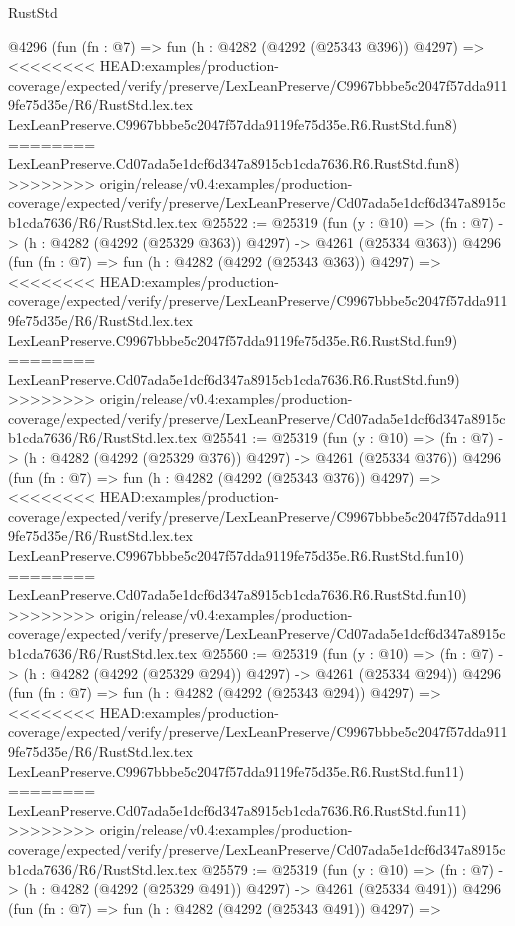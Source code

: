 \begin{lexlean}{RustStd}
\begin{coremodule}
{\begin{coremodule}
{{{{{{{{{{{{{{{{{{{{{{{{{{{{{{{{{{{    @4296
    (fun (fn : @7) =>
    fun (h : @4282 (@4292 (@25343 @396)) @4297) =>
<<<<<<<< HEAD:examples/production-coverage/expected/verify/preserve/LexLeanPreserve/C9967bbbe5c2047f57dda9119fe75d35e/R6/RustStd.lex.tex
    LexLeanPreserve.C9967bbbe5c2047f57dda9119fe75d35e.R6.RustStd.fun8)
========
    LexLeanPreserve.Cd07ada5e1dcf6d347a8915cb1cda7636.R6.RustStd.fun8)
>>>>>>>> origin/release/v0.4:examples/production-coverage/expected/verify/preserve/LexLeanPreserve/Cd07ada5e1dcf6d347a8915cb1cda7636/R6/RustStd.lex.tex
@25522 := @25319
    (fun (y : @10) => (fn : @7) -> (h : @4282 (@4292 (@25329 @363)) @4297) -> @4261 (@25334 @363))
    @4296
    (fun (fn : @7) =>
    fun (h : @4282 (@4292 (@25343 @363)) @4297) =>
<<<<<<<< HEAD:examples/production-coverage/expected/verify/preserve/LexLeanPreserve/C9967bbbe5c2047f57dda9119fe75d35e/R6/RustStd.lex.tex
    LexLeanPreserve.C9967bbbe5c2047f57dda9119fe75d35e.R6.RustStd.fun9)
========
    LexLeanPreserve.Cd07ada5e1dcf6d347a8915cb1cda7636.R6.RustStd.fun9)
>>>>>>>> origin/release/v0.4:examples/production-coverage/expected/verify/preserve/LexLeanPreserve/Cd07ada5e1dcf6d347a8915cb1cda7636/R6/RustStd.lex.tex
@25541 := @25319
    (fun (y : @10) => (fn : @7) -> (h : @4282 (@4292 (@25329 @376)) @4297) -> @4261 (@25334 @376))
    @4296
    (fun (fn : @7) =>
    fun (h : @4282 (@4292 (@25343 @376)) @4297) =>
<<<<<<<< HEAD:examples/production-coverage/expected/verify/preserve/LexLeanPreserve/C9967bbbe5c2047f57dda9119fe75d35e/R6/RustStd.lex.tex
    LexLeanPreserve.C9967bbbe5c2047f57dda9119fe75d35e.R6.RustStd.fun10)
========
    LexLeanPreserve.Cd07ada5e1dcf6d347a8915cb1cda7636.R6.RustStd.fun10)
>>>>>>>> origin/release/v0.4:examples/production-coverage/expected/verify/preserve/LexLeanPreserve/Cd07ada5e1dcf6d347a8915cb1cda7636/R6/RustStd.lex.tex
@25560 := @25319
    (fun (y : @10) => (fn : @7) -> (h : @4282 (@4292 (@25329 @294)) @4297) -> @4261 (@25334 @294))
    @4296
    (fun (fn : @7) =>
    fun (h : @4282 (@4292 (@25343 @294)) @4297) =>
<<<<<<<< HEAD:examples/production-coverage/expected/verify/preserve/LexLeanPreserve/C9967bbbe5c2047f57dda9119fe75d35e/R6/RustStd.lex.tex
    LexLeanPreserve.C9967bbbe5c2047f57dda9119fe75d35e.R6.RustStd.fun11)
========
    LexLeanPreserve.Cd07ada5e1dcf6d347a8915cb1cda7636.R6.RustStd.fun11)
>>>>>>>> origin/release/v0.4:examples/production-coverage/expected/verify/preserve/LexLeanPreserve/Cd07ada5e1dcf6d347a8915cb1cda7636/R6/RustStd.lex.tex
@25579 := @25319
    (fun (y : @10) => (fn : @7) -> (h : @4282 (@4292 (@25329 @491)) @4297) -> @4261 (@25334 @491))
    @4296
    (fun (fn : @7) =>
    fun (h : @4282 (@4292 (@25343 @491)) @4297) =>
}}}}}}}}}}}}}}}}}}}}}}}}}}}}}}}}}}}
\end{coremodule}}
\end{coremodule}
\end{lexlean}
